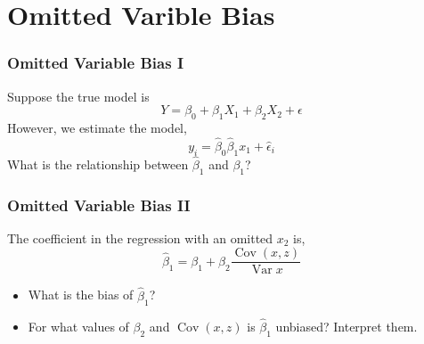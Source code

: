 \documentclass{beamer}
\DeclareMathOperator{\cov}{Cov}
\DeclareMathOperator{\var}{Var}
\begin{document}
\section{Omitted Varible Bias}

\begin{frame}
\frametitle{Omitted Variable Bias I}

Suppose the true model is 
\begin{equation*}
Y = \beta_0 + \beta_1 X_1 + \beta_2 X_2 + \epsilon
\end{equation*}
However, we estimate the model,
\begin{equation*}
y_i = \hat\beta_0 \hat\beta_1 x_1 + \hat\epsilon_i
\end{equation*}
What is the relationship between $\hat\beta_1$ and $\beta_1$?
\end{frame}

\begin{frame}
\frametitle{Omitted Variable Bias II}

The coefficient in the regression with an omitted $x_2$ is,
\begin{equation*}
\hat\beta_1 = \beta_1 + \beta_2 \frac{\cov(x, z)}{\var{x}}
\end{equation*}

\begin{itemize}
\item What is the bias of $\hat\beta_1$?
\item For what values of $\beta_2$ and $\cov(x, z)$ is $\hat\beta_1$ unbiased? Interpret them.
\end{itemize}
\end{frame}
\end{document}
